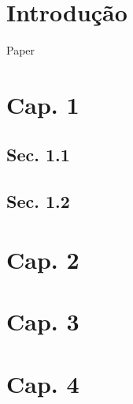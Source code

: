 \documentclass[
	article,			%
	11pt,				%
	oneside,			%
	a4paper,			%
	english,			%
	brazil,				%
	sumario=tradicional
	]{abntex2}
\begin{document}
\textual
\section*{Introdução}

Paper \cite{fehrman2015}

\section{Cap. 1}

\lipsum[2]

\subsection{Sec. 1.1}

\lipsum[3]

\subsection{Sec. 1.2}

\lipsum[4]

\section{Cap. 2}

\lipsum[5]

\section{Cap. 3}

\lipsum[6]

\section{Cap. 4}

\lipsum[7]

% 

\end{document}

